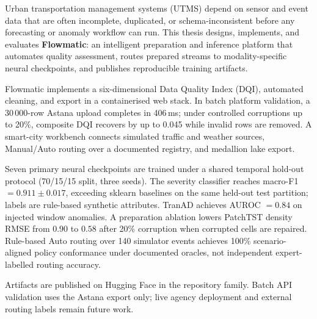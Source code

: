 Urban transportation management systems (UTMS) depend on sensor and event data that are often incomplete, duplicated, or schema-inconsistent before any forecasting or anomaly workflow can run. This thesis designs, implements, and evaluates \textbf{Flowmatic}: an intelligent preparation and inference platform that automates quality assessment, routes prepared streams to modality-specific neural checkpoints, and publishes reproducible training artifacts.

Flowmatic implements a six-dimensional Data Quality Index (DQI), automated cleaning, and export in a containerised web stack. In batch platform validation, a 30\,000-row Astana upload completes in 406\,ms; under controlled corruptions up to 20\%, composite DQI recovers by up to 0.045 while invalid rows are removed. A smart-city workbench connects simulated traffic and weather sources, Manual/Auto routing over a documented registry, and medallion lake export.

Seven primary neural checkpoints are trained under a shared temporal hold-out protocol (70/15/15 split, three seeds). The severity classifier reaches macro-F1 $= 0.911 \pm 0.017$, exceeding sklearn baselines on the same held-out test partition; labels are rule-based synthetic attributes. TranAD achieves AUROC $= 0.84$ on injected window anomalies. A preparation ablation lowers PatchTST density RMSE from $0.90$ to $0.58$ after 20\% corruption when corrupted cells are repaired. Rule-based Auto routing over 140 simulator events achieves 100\% scenario-aligned policy conformance under documented oracles, not independent expert-labelled routing accuracy.

Artifacts are published on Hugging Face in the \flowmaticrepo{} repository family. Batch API validation uses the Astana export only; live agency deployment and external routing labels remain future work.

